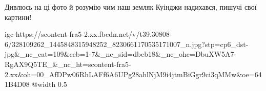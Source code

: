 
Дивлюсь на ці фото й розумію чим наш земляк Куінджи надихався, пишучі свої картини!


\ifcmt
  igc https://scontent-fra5-2.xx.fbcdn.net/v/t39.30808-6/328109262_1445848315948252_8230661170535171007_n.jpg?stp=cp6_dst-jpg&_nc_cat=109&ccb=1-7&_nc_sid=dbeb18&_nc_ohc=DbuXW5A7-RgAX9Q5TE_&_nc_ht=scontent-fra5-2.xx&oh=00_AfDPw06RhLAFf6A6UPg28ahlNjM9i4jtmBiGgr9ci3qMMw&oe=641B4D08
	@width 0.5
\fi

